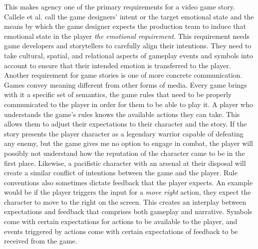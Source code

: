 This makes agency one of the primary requirements for a video game story. Callele et al. call the game designers’ intent or the target emotional state and the means by which the game designer expects the production team to induce that emotional state in the player \textit{the emotional requirement}. This requirement needs game developers and storytellers to carefully align their intentions. They need to take cultural, spatial, and relational aspects of gameplay events and symbols into account to ensure that their intended emotion is transferred to the player.~\cite{Callele2008}\\
Another requirement for game stories is one of more concrete communication. Games convey meaning different from other forms of media. Every game brings with it a specific set of semantics, the game rules that need to be properly communicated to the player in order for them to be able to play it. A player who understands the game’s rules knows the available actions they can take. This allows them to adjust their expectations to their character and the story. If the story presents the player character as a legendary warrior capable of defeating any enemy, but the game gives me no option to engage in combat, the player will possibly not understand how the reputation of the character came to be in the first place. Likewise, a pacifistic character with an arsenal at their disposal will create a similar conflict of intentions between the game and the player. Rule conventions also sometimes dictate feedback that the player expects. An example would be if the player triggers the input for a \textit{move right} action, they expect the character to move to the right on the screen. This creates an interplay between expectations and feedback that comprises both gameplay and narrative. Symbols come with certain expectations for actions to be available to the player, and events triggered by actions come with certain expectations of feedback to be received from the game.
